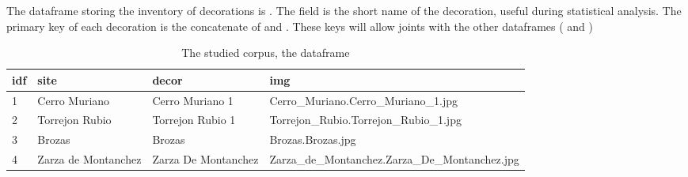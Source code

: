 \documentclass[article]{jss}\usepackage{knitr}
\begin{document}
The dataframe storing the inventory of decorations is . The field  is the short name of the decoration, useful during statistical analysis. The primary key of each decoration is the concatenate of  and . These keys will allow joints with the other dataframes ( and )\\
%
\begin{table}[H]
\centering
\begin{tabular}{|p{0.5cm}|p{2.5cm}|p{2.5cm}|p{8.5cm}|}
  \hline
idf & site & decor & img \\ 
  \hline
  1 & Cerro Muriano & Cerro Muriano 1 & Cerro\_Muriano.Cerro\_Muriano\_1.jpg \\ 
    2 & Torrejon Rubio & Torrejon Rubio 1 & Torrejon\_Rubio.Torrejon\_Rubio\_1.jpg \\ 
    3 & Brozas & Brozas & Brozas.Brozas.jpg \\ 
    4 & Zarza de Montanchez & Zarza De Montanchez & Zarza\_de\_Montanchez.Zarza\_De\_Montanchez.jpg \\ 
   \hline
\end{tabular}
\caption{The studied corpus, the  dataframe} 
\label{Test_table}
\end{table}
\end{document}
